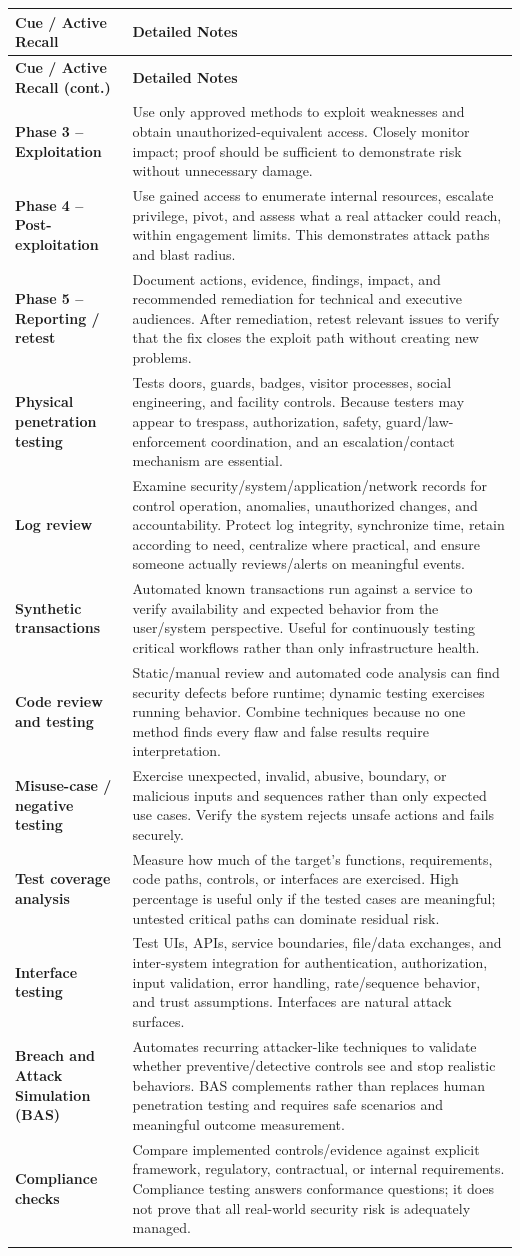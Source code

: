 \documentclass[10pt,letterpaper]{article}
\makeatletter
\newenvironment{cornell}{\rowcolors{2}{white}{notebg}\begin{longtable}{@{}>{\raggedright\arraybackslash\columncolor{cuebg}\color{navy}\bfseries}p{0.285\textwidth}>{\raggedright\arraybackslash}p{0.65\textwidth}@{}}\rowcolor{navy}\color{white}\textbf{Cue / Active Recall} & \color{white}\textbf{Detailed Notes}\\ \hline\endfirsthead\rowcolor{navy}\color{white}\textbf{Cue / Active Recall (cont.)} & \color{white}\textbf{Detailed Notes}\\ \hline\endhead}{\end{longtable}}
\newcommand{\noterow}[2]{#1 & #2\\\arrayrulecolor{line}\hline}\newcommand{\source}[1]{\par{\footnotesize\color{teal}\textit{Source: CBK, #1}}\par}
\makeatother
\begin{document}
\begin{cornell}
\noterow{Phase 3 -- Exploitation}{Use only approved methods to exploit weaknesses and obtain unauthorized-equivalent access. Closely monitor impact; proof should be sufficient to demonstrate risk without unnecessary damage.}
\noterow{Phase 4 -- Post-exploitation}{Use gained access to enumerate internal resources, escalate privilege, pivot, and assess what a real attacker could reach, within engagement limits. This demonstrates attack paths and blast radius.}
\noterow{Phase 5 -- Reporting / retest}{Document actions, evidence, findings, impact, and recommended remediation for technical and executive audiences. After remediation, retest relevant issues to verify that the fix closes the exploit path without creating new problems.}
\noterow{Physical penetration testing}{Tests doors, guards, badges, visitor processes, social engineering, and facility controls. Because testers may appear to trespass, authorization, safety, guard/law-enforcement coordination, and an escalation/contact mechanism are essential.}
\noterow{Log review}{Examine security/system/application/network records for control operation, anomalies, unauthorized changes, and accountability. Protect log integrity, synchronize time, retain according to need, centralize where practical, and ensure someone actually reviews/alerts on meaningful events.}
\noterow{Synthetic transactions}{Automated known transactions run against a service to verify availability and expected behavior from the user/system perspective. Useful for continuously testing critical workflows rather than only infrastructure health.}
\noterow{Code review and testing}{Static/manual review and automated code analysis can find security defects before runtime; dynamic testing exercises running behavior. Combine techniques because no one method finds every flaw and false results require interpretation.}
\noterow{Misuse-case / negative testing}{Exercise unexpected, invalid, abusive, boundary, or malicious inputs and sequences rather than only expected use cases. Verify the system rejects unsafe actions and fails securely.}
\noterow{Test coverage analysis}{Measure how much of the target's functions, requirements, code paths, controls, or interfaces are exercised. High percentage is useful only if the tested cases are meaningful; untested critical paths can dominate residual risk.}
\noterow{Interface testing}{Test UIs, APIs, service boundaries, file/data exchanges, and inter-system integration for authentication, authorization, input validation, error handling, rate/sequence behavior, and trust assumptions. Interfaces are natural attack surfaces.}
\noterow{Breach and Attack Simulation (BAS)}{Automates recurring attacker-like techniques to validate whether preventive/detective controls see and stop realistic behaviors. BAS complements rather than replaces human penetration testing and requires safe scenarios and meaningful outcome measurement.}
\noterow{Compliance checks}{Compare implemented controls/evidence against explicit framework, regulatory, contractual, or internal requirements. Compliance testing answers conformance questions; it does not prove that all real-world security risk is adequately managed.}
\end{cornell}
\end{document}
